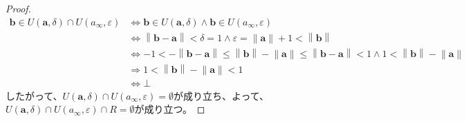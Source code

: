\documentclass[dvipdfmx]{jsarticle}
\begin{document}
\begin{proof}
\begin{align*}
\mathbf{b} \in U\left( \mathbf{a},\delta \right) \cap U\left( a_{\infty},\varepsilon \right) &\Leftrightarrow \mathbf{b} \in U\left( \mathbf{a},\delta \right) \land \mathbf{b} \in U\left( a_{\infty},\varepsilon \right)\\
&\Leftrightarrow \left\| \mathbf{b} - \mathbf{a} \right\| < \delta = 1 \land \varepsilon = \left\| \mathbf{a} \right\| + 1 < \left\| \mathbf{b} \right\|\\
&\Leftrightarrow - 1 < - \left\| \mathbf{b} - \mathbf{a} \right\| \leq \left\| \mathbf{b} \right\| - \left\| \mathbf{a} \right\| \leq \left\| \mathbf{b} - \mathbf{a} \right\| < 1 \land 1 < \left\| \mathbf{b} \right\| - \left\| \mathbf{a} \right\|\\
&\Rightarrow 1 < \left\| \mathbf{b} \right\| - \left\| \mathbf{a} \right\| < 1\\
&\Leftrightarrow \bot
\end{align*}
したがって、$U\left( \mathbf{a},\delta \right) \cap U\left( a_{\infty},\varepsilon \right) = \emptyset$が成り立ち、よって、$U\left( \mathbf{a},\delta \right) \cap U\left( a_{\infty},\varepsilon \right) \cap R = \emptyset$が成り立つ。
\end{proof}
\end{document}
